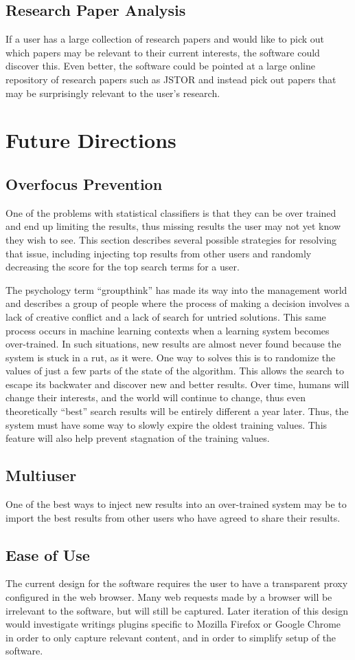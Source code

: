 \documentclass[12pt]{article}
\begin{document}
\subsection{Research Paper Analysis}
If a user has a large collection of research papers and would like to pick out which papers may be relevant to
their current interests, the software could discover this. Even better, the software could be pointed at a
large online repository of research papers such as JSTOR and instead pick out papers that may be surprisingly
relevant to the user's research.
\section{Future Directions}
\subsection{Overfocus Prevention}
One of the problems with statistical classifiers is that they can be over trained and end up limiting the
results, thus missing results the user may not yet know they wish to see.  This section describes several
possible strategies for resolving that issue, including injecting top results from other users and randomly
decreasing the score for the top search terms for a user.

The psychology term ``groupthink'' has made its way into the management world and describes a group of people
where the process of making a decision involves a lack of creative conflict and a lack of search for untried
solutions. This same process occurs in machine learning contexts when a learning system becomes
over-trained. In such situations, new results are almost never found because the system is stuck in a rut, as
it were. One way to solves this is to randomize the values of just a few parts of the state of the
algorithm. This allows the search to escape its backwater and discover new and better results.  Over time,
humans will change their interests, and the world will continue to change, thus even theoretically ``best''
search results will be entirely different a year later.  Thus, the system must have some way to slowly expire
the oldest training values. This feature will also help prevent stagnation of the training values.
\subsection{Multiuser}
One of the best ways to inject new results into an over-trained system may be to import the best results from
other users who have agreed to share their results.
\subsection{Ease of Use}
The current design for the software requires the user to have a transparent proxy configured in the web
browser.  Many web requests made by a browser will be irrelevant to the software, but will still be captured.
Later iteration of this design would investigate writings plugins specific to Mozilla Firefox or Google Chrome
in order to only capture relevant content, and in order to simplify setup of the software.
\pagebreak{}


\end{document}

